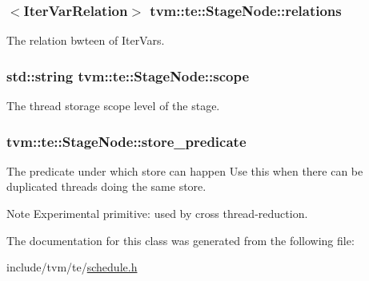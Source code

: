 \subsubsection[{\texorpdfstring{relations}{relations}}]{$<${\bf Iter\+Var\+Relation}$>$ tvm\+::te\+::\+Stage\+Node\+::relations}\hypertarget{classtvm_1_1te_1_1StageNode_ad1c0f8dc1f0f406a2abcd05fdad8fad5}{}\label{classtvm_1_1te_1_1StageNode_ad1c0f8dc1f0f406a2abcd05fdad8fad5}


The relation bwteen of Iter\+Vars. 

\subsubsection[{\texorpdfstring{scope}{scope}}]{\setlength{\rightskip}{0pt plus 5cm}std\+::string tvm\+::te\+::\+Stage\+Node\+::scope}\hypertarget{classtvm_1_1te_1_1StageNode_a55acf027a39738cd1ddd063b27086038}{}\label{classtvm_1_1te_1_1StageNode_a55acf027a39738cd1ddd063b27086038}


The thread storage scope level of the stage. 

\subsubsection[{\texorpdfstring{store\+\_\+predicate}{store_predicate}}]{ tvm\+::te\+::\+Stage\+Node\+::store\+\_\+predicate}\hypertarget{classtvm_1_1te_1_1StageNode_a8f4ba7f2931b3541c12734af511600a7}{}\label{classtvm_1_1te_1_1StageNode_a8f4ba7f2931b3541c12734af511600a7}


The predicate under which store can happen Use this when there can be duplicated threads doing the same store. 

\begin{DoxyNote}{Note}
Experimental primitive\+: used by cross thread-\/reduction. 
\end{DoxyNote}


The documentation for this class was generated from the following file\+:\begin{DoxyCompactItemize}
\item 
include/tvm/te/\hyperlink{schedule_8h}{schedule.\+h}\end{DoxyCompactItemize}
